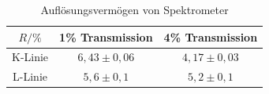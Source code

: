 \begin{table}[h]
    \centering
    \caption{Auflösungsvermögen von Spektrometer}
    \label{tab:aufloesung}
    \begin{tabular}{c | c c}
      \toprule
       $R/ \%$ & 1\% Transmission & 4\% Transmission \\
      \midrule
      K-Linie & $6,43 \pm 0,06$ & $4,17 \pm 0,03$\\
      L-Linie & $5,6 \pm 0,1$ & $5,2 \pm 0,1$\\
      \bottomrule
    \end{tabular}
  \end{table}


